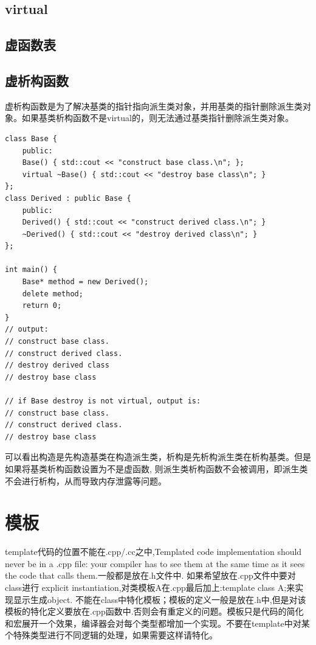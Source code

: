 \documentclass[12pt]{book}
\begin{document}
\subsection{virtual}
\subsection{虚函数表}
\subsection{虚析构函数}
虚析构函数是为了解决基类的指针指向派生类对象，并用基类的指针删除派生类对象。如果基类析构函数不是virtual的，则无法通过基类指针删除派生类对象。
\begin{lstlisting}
class Base {
	public:
	Base() { std::cout << "construct base class.\n"; };
	virtual ~Base() { std::cout << "destroy base class\n"; }
};
class Derived : public Base {
	public:
	Derived() { std::cout << "construct derived class.\n"; }
	~Derived() { std::cout << "destroy derived class\n"; }
};

int main() {
	Base* method = new Derived();
	delete method;
	return 0;
}
// output:
// construct base class.
// construct derived class.
// destroy derived class
// destroy base class

// if Base destroy is not virtual, output is:
// construct base class.
// construct derived class.
// destroy base class
\end{lstlisting}
可以看出构造是先构造基类在构造派生类，析构是先析构派生类在析构基类。但是如果将基类析构函数设置为不是虚函数, 则派生类析构函数不会被调用，即派生类不会进行析构，从而导致内存泄露等问题。


\section{模板}
template代码的位置不能在.cpp/.cc之中,Templated code implementation should never be in a .cpp file: your compiler has to see them at the same time as it sees the code that calls them.一般都是放在.h文件中. 如果希望放在.cpp文件中要对class进行 explicit instantiation,对类模板A在.cpp最后加上:template class A;来实现显示生成object. 不能在class中特化模板；模板的定义一般是放在.h中,但是对该模板的特化定义要放在.cpp函数中.否则会有重定义的问题。模板只是代码的简化和宏展开一个效果，编译器会对每个类型都增加一个实现。不要在template中对某个特殊类型进行不同逻辑的处理，如果需要这样请特化。
\end{document}
